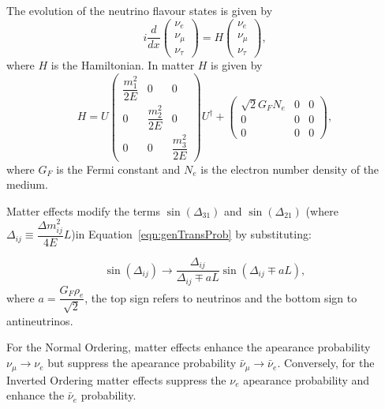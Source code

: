 The evolution of the neutrino flavour states is given by
\begin{equation}
 i\dfrac{d}{dx} \left( 
   \begin{array}{c}
     \nu_e\\
     \nu_\mu\\
     \nu_\tau
   \end{array}
   \right) =
   H \left(
   \begin{array}{c}
     \nu_e\\
     \nu_\mu\\
     \nu_\tau
   \end{array}
   \right),
\end{equation}
\noindent where $H$ is the Hamiltonian. In matter $H$ is given by
\begin{equation}
  H = U
  \begin{pmatrix}
    \dfrac{m_1^2}{2E} & 0 & 0 \\
    0 & \dfrac{m_2^2}{2E} & 0 \\ 
    0 & 0 & \dfrac{m_3^2}{2E}
  \end{pmatrix}
  U^\dagger +
  \begin{pmatrix}
    \sqrt{2}G_FN_e & 0 & 0 \\
    0 & 0 & 0 \\ 
    0 & 0 & 0
  \end{pmatrix},
\end{equation}
\noindent where $G_F$ is the Fermi constant and $N_e$ is the electron
number density of the medium. 

Matter effects modify the terms
$\sin \left( \Delta_{31} \right)$ and $\sin\left( \Delta_{21}
\right)$ (where $\Delta_{ij} \equiv \dfrac{\Delta m_{ij}^2}{4E}L$)in
Equation~\ref{eqn:genTransProb} by substituting: 

\begin{equation}
\sin \left( \Delta_{ij} \right) \rightarrow
\dfrac{\Delta_{ij}}{\Delta_{ij} \mp aL} 
\sin \left( \Delta_{ij} \mp aL \right),
\end{equation}
\noindent where $a = \dfrac{G_F\rho_e}{\sqrt{2}}$, the top sign refers
to neutrinos and the bottom sign to antineutrinos. \cite{TDR} 

For the Normal Ordering, matter effects enhance the apearance
probability $\nu_\mu \rightarrow \nu_e$ but suppress the apearance
probability $\bar{\nu}_\mu \rightarrow \bar{\nu}_e$. Conversely, for
the Inverted Ordering matter effects suppress the $\nu_e$ apearance
probability and enhance the $\bar{\nu}_e$ probability.

